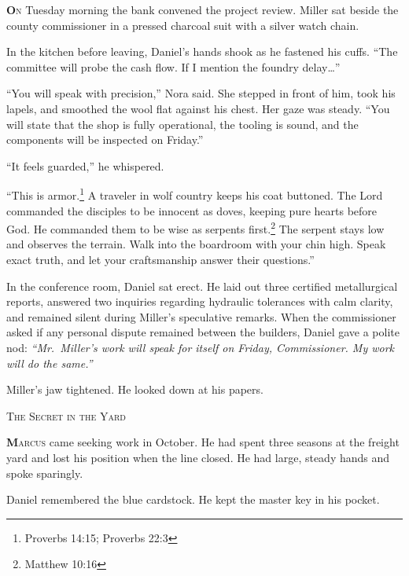 \documentclass[11pt]{article}
\begin{document}
\lettrine[lines=3,findent=3pt,nindent=0pt]{\textbf{O}}{n} Tuesday morning the bank convened the project review. Miller sat beside the county commissioner in a pressed charcoal suit with a silver watch chain.

In the kitchen before leaving, Daniel’s hands shook as he fastened his cuffs. ``The committee will probe the cash flow. If I mention the foundry delay\dots''

``You will speak with precision,'' Nora said. She stepped in front of him, took his lapels, and smoothed the wool flat against his chest. Her gaze was steady. ``You will state that the shop is fully operational, the tooling is sound, and the components will be inspected on Friday.''

``It feels guarded,'' he whispered.

``This is armor.\footnote{Proverbs 14:15; Proverbs 22:3} A traveler in wolf country keeps his coat buttoned. The Lord commanded the disciples to be innocent as doves, keeping pure hearts before God. He commanded them to be wise as serpents first.\footnote{Matthew 10:16} The serpent stays low and observes the terrain. Walk into the boardroom with your chin high. Speak exact truth, and let your craftsmanship answer their questions.''

In the conference room, Daniel sat erect. He laid out three certified metallurgical reports, answered two inquiries regarding hydraulic tolerances with calm clarity, and remained silent during Miller’s speculative remarks. When the commissioner asked if any personal dispute remained between the builders, Daniel gave a polite nod: \textit{``Mr.~Miller’s work will speak for itself on Friday, Commissioner. My work will do the same.''}

Miller’s jaw tightened. He looked down at his papers.

\newpage

\begin{center}
    {\scshape\large The Secret in the Yard}\par
    \vspace{0.2in}
\end{center}

\lettrine[lines=3,findent=3pt,nindent=0pt]{\textbf{M}}{arcus} came seeking work in October. He had spent three seasons at the freight yard and lost his position when the line closed. He had large, steady hands and spoke sparingly.

Daniel remembered the blue cardstock. He kept the master key in his pocket.
\end{document}
